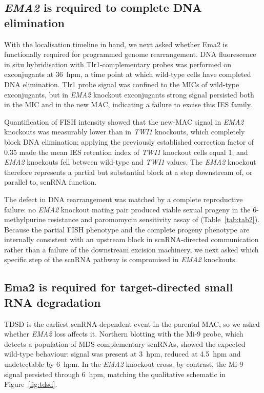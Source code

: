 \documentclass[11pt]{article}
\begin{document}
\subsection{\emph{EMA2} is required to complete DNA elimination}

With the localisation timeline in hand, we next asked whether Ema2 is
functionally required for programmed genome rearrangement. DNA
fluorescence in situ hybridisation with Tlr1-complementary probes
\citep{cheng2010transposase} was performed on exconjugants at 36~hpm, a
time point at which wild-type cells have completed DNA elimination.
Tlr1 probe signal was confined to the MICs of wild-type exconjugants, but
in \emph{EMA2} knockout exconjugants strong signal persisted both in the
MIC and in the new MAC, indicating a failure to excise this IES family.

Quantification of FISH intensity showed that the new-MAC signal in
\emph{EMA2} knockouts was measurably lower than in \emph{TWI1} knockouts,
which completely block DNA elimination; applying the previously
established correction factor of 0.35 made the mean IES retention index
of \emph{TWI1} knockout cells equal 1, and \emph{EMA2} knockouts fell
between wild-type and \emph{TWI1} values. The \emph{EMA2} knockout
therefore represents a partial but substantial block at a step downstream
of, or parallel to, scnRNA function.

The defect in DNA rearrangement was matched by a complete reproductive
failure: no \emph{EMA2} knockout mating pair produced viable sexual
progeny in the 6-methylpurine resistance and paromomycin sensitivity
assay of \citet{mochizuki2002twi1} (Table~\ref{tab:tab2}). Because the
partial FISH phenotype and the complete progeny phenotype are internally
consistent with an upstream block in scnRNA-directed communication rather
than a failure of the downstream excision machinery, we next asked which
specific step of the scnRNA pathway is compromised in \emph{EMA2}
knockouts.

\subsection{Ema2 is required for target-directed small RNA degradation}

TDSD is the earliest scnRNA-dependent event in the parental MAC, so we
asked whether \emph{EMA2} loss affects it. Northern blotting with the
Mi-9 probe, which detects a population of MDS-complementary scnRNAs,
showed the expected wild-type behaviour: signal was present at 3~hpm,
reduced at 4.5~hpm and undetectable by 6~hpm. In the \emph{EMA2} knockout
cross, by contrast, the Mi-9 signal persisted through 6~hpm, matching
the qualitative schematic in Figure~\ref{fig:tdsd}.
\end{document}
